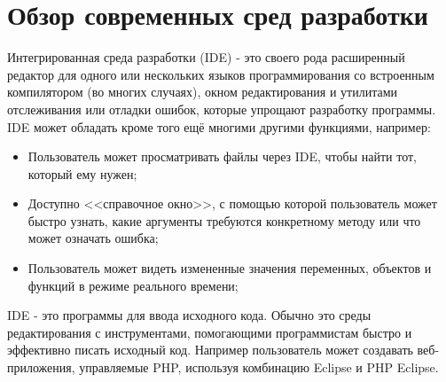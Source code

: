 \chapter{Обзор современных сред разработки}
\label{cha:ch_2}

Интегрированная среда разработки (IDE) - это своего рода расширенный редактор для одного или нескольких 
языков программирования со встроенным компилятором (во многих случаях), окном редактирования и 
утилитами отслеживания или
отладки ошибок, которые упрощают разработку программы. IDE может обладать кроме того ещё многими другими 
функциями, например:\\
\begin{itemize}
    \item Пользователь может просматривать файлы через IDE, чтобы найти тот, который ему нужен;\\
    \item Доступно <<справочное окно>>, с помощью которой пользователь может быстро узнать, какие аргументы 
        требуются конкретному методу или что может означать ошибка;\\
    \item Пользователь может видеть измененные значения переменных, объектов и функций в режиме 
        реального времени;\\
\end{itemize}

IDE - это программы для ввода исходного кода. Обычно это среды редактирования с инструментами, 
помогающими программистам быстро и эффективно писать исходный код. Например пользователь может 
создавать веб-приложения, управляемые PHP, используя комбинацию Eclipse и PHP Eclipse.\\

